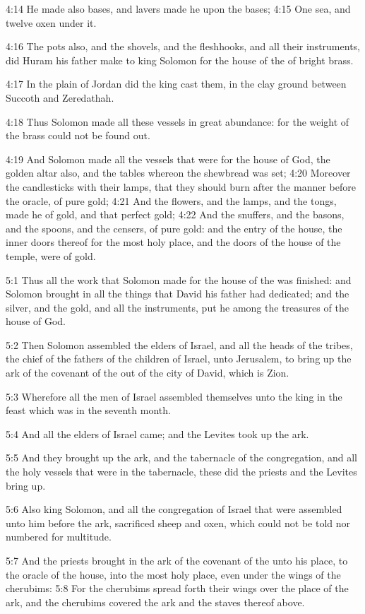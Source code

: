 4:14 He made also bases, and lavers made he upon the bases; 4:15 One
sea, and twelve oxen under it.

4:16 The pots also, and the shovels, and the fleshhooks, and all their
instruments, did Huram his father make to king Solomon for the house
of the \LORD of bright brass.

4:17 In the plain of Jordan did the king cast them, in the clay ground
between Succoth and Zeredathah.

4:18 Thus Solomon made all these vessels in great abundance: for the
weight of the brass could not be found out.

4:19 And Solomon made all the vessels that were for the house of God,
the golden altar also, and the tables whereon the shewbread was set;
4:20 Moreover the candlesticks with their lamps, that they should burn
after the manner before the oracle, of pure gold; 4:21 And the
flowers, and the lamps, and the tongs, made he of gold, and that
perfect gold; 4:22 And the snuffers, and the basons, and the spoons,
and the censers, of pure gold: and the entry of the house, the inner
doors thereof for the most holy place, and the doors of the house of
the temple, were of gold.

5:1 Thus all the work that Solomon made for the house of the \LORD was
finished: and Solomon brought in all the things that David his father
had dedicated; and the silver, and the gold, and all the instruments,
put he among the treasures of the house of God.

5:2 Then Solomon assembled the elders of Israel, and all the heads of
the tribes, the chief of the fathers of the children of Israel, unto
Jerusalem, to bring up the ark of the covenant of the \LORD out of the
city of David, which is Zion.

5:3 Wherefore all the men of Israel assembled themselves unto the king
in the feast which was in the seventh month.

5:4 And all the elders of Israel came; and the Levites took up the
ark.

5:5 And they brought up the ark, and the tabernacle of the
congregation, and all the holy vessels that were in the tabernacle,
these did the priests and the Levites bring up.

5:6 Also king Solomon, and all the congregation of Israel that were
assembled unto him before the ark, sacrificed sheep and oxen, which
could not be told nor numbered for multitude.

5:7 And the priests brought in the ark of the covenant of the \LORD
unto his place, to the oracle of the house, into the most holy place,
even under the wings of the cherubims: 5:8 For the cherubims spread
forth their wings over the place of the ark, and the cherubims covered
the ark and the staves thereof above.

